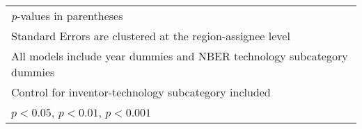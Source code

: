 {\begin{longtable}{l*{3}{c}}
\hline\hline
\multicolumn{4}{l}{\footnotesize \textit{p}-values in parentheses}\\
\multicolumn{4}{l}{\footnotesize Standard Errors are clustered at the region-assignee level}\\
\multicolumn{4}{l}{\footnotesize All models include year dummies and NBER technology subcategory dummies}\\
\multicolumn{4}{l}{\footnotesize Control for inventor-technology subcategory included}\\
\multicolumn{4}{l}{\footnotesize \sym{*} \(p<0.05\), \sym{**} \(p<0.01\), \sym{***} \(p<0.001\)}\\
\end{longtable}
}
